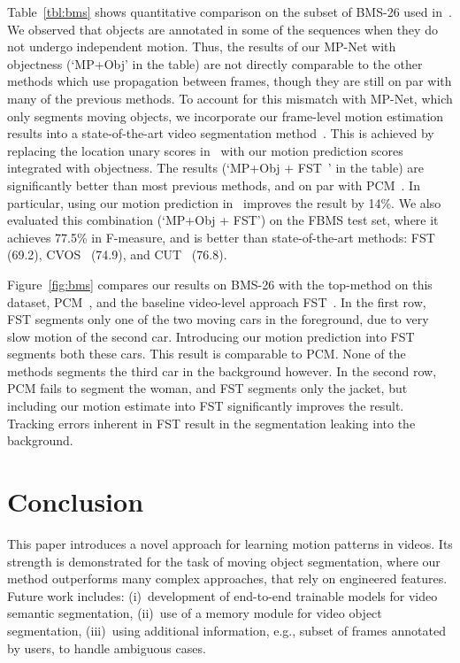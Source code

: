 \documentclass[10pt,twocolumn,letterpaper]{article}
\begin{document}
Table~\ref{tbl:bms} shows quantitative comparison on the subset of BMS-26 used
in~\cite{Bideau16}. We observed that objects are annotated in some of the
sequences when they do not undergo independent motion. Thus, the results of our
MP-Net with objectness (`MP+Obj' in the table) are not directly comparable to
the other methods which use propagation between frames, though they are still
on par with many of the previous methods.  To account for this mismatch with
MP-Net, which only segments moving objects, we incorporate our frame-level
motion estimation results into a state-of-the-art video segmentation
method~\cite{papazoglou2013fast}. This is achieved by replacing the location
unary scores in~\cite{papazoglou2013fast} with our motion prediction scores
integrated with objectness. The results (`MP+Obj +
FST~\cite{papazoglou2013fast}' in the table) are significantly better than most
previous methods, and on par with PCM~\cite{Bideau16}. In particular, using our
motion prediction in~\cite{papazoglou2013fast} improves the result by 14\%. We
also evaluated this combination (`MP+Obj + FST') on the FBMS test set, where it
achieves 77.5\% in F-measure, and is better than state-of-the-art methods:
FST~\cite{papazoglou2013fast} (69.2), CVOS~\cite{taylor2015causal} (74.9), and
CUT~\cite{keuper2015motion} (76.8).

Figure~\ref{fig:bms} compares our results on BMS-26 with the top-method on this
dataset, PCM~\cite{Bideau16}, and the baseline video-level approach
FST~\cite{papazoglou2013fast}. In the first row, FST segments only one of the
two moving cars in the foreground, due to very slow motion of the second car.
Introducing our motion prediction into FST segments both these cars. This
result is comparable to PCM. None of the methods segments the third car in the
background however. In the second row, PCM fails to segment the woman, and FST
segments only the jacket, but including our motion estimate into FST
significantly improves the result. Tracking errors inherent in FST result in
the segmentation leaking into the background.

\vspace{-0.2cm}
\section{Conclusion}
\vspace{-0.2cm}
This paper introduces a novel approach for learning motion patterns in videos.
Its strength is demonstrated for the task of moving object segmentation, where
our method outperforms many complex approaches, that rely on engineered
features. Future work includes: (i)~development of end-to-end trainable models
for video semantic segmentation, (ii)~use of a memory module for video object
segmentation, (iii)~using additional information, e.g., subset of frames
annotated by users, to handle ambiguous cases.
\end{document}
